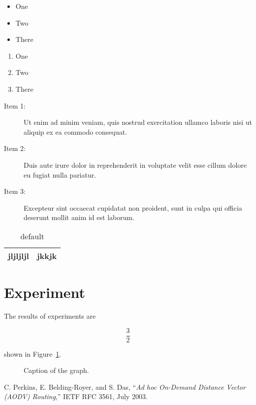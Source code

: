 \documentclass[12pt]{IEEEtran} %
\begin{document}
\begin{itemize}
\item One
\item Two
\item There
\end{itemize}

\begin{enumerate}
\item One
\item Two
\item There
\end{enumerate}

\begin{description}
\item[Item 1:] Ut enim ad minim veniam, quis nostrud exercitation ullamco
laboris nisi ut aliquip ex ea commodo consequat.
\item[Item 2:]  Duis aute irure dolor in reprehenderit in voluptate
velit esse cillum dolore eu fugiat nulla pariatur.
\item[Item 3:]  Excepteur sint occaecat cupidatat non proident, sunt in
culpa qui officia deserunt mollit anim id est laborum.
\end{description}

\begin{table}[htdp]
\caption{default}
\begin{center}
\begin{tabular}{|c|c|}
\hline
jljljljl&jkkjk\\
\hline
\end{tabular}
\end{center}
\label{default}
\end{table}%


\section{Experiment}

The results of experiments are 

$$\frac{3}{2}$$ 

shown in Figure~\ref{fig:graph}.

\begin{figure}[bht]
\begin{center}
\end{center}
\caption{Caption of the graph.}
\label{fig:graph}
\end{figure}


\begin{thebibliography}{1}

C. Perkins,  E. Belding-Royer, and  S. Das, ``\emph{Ad hoc On-Demand
Distance Vector (AODV) Routing},'' IETF RFC 3561, July 2003.

\end{thebibliography}
\end{document}
